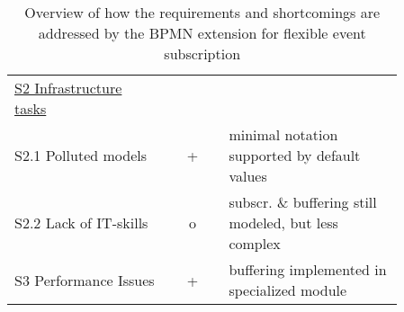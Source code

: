 \begin{table}
\begin{tabularx}{\textwidth}{p{0.4\linewidth} | c | p{0.455\linewidth}}
		\rule{0pt}{4ex}\underline{S2 Infrastructure tasks} & & \\
		S2.1 Polluted models & + & minimal notation supported by default values \\
		S2.2 Lack of IT-skills & o & subscr. \& buffering still modeled, but less complex \\
		
		\rule{0pt}{4ex}S3 Performance Issues & + & buffering implemented in specialized module \\		
		
	\end{tabularx}
	\caption[]{Overview of how the requirements and shortcomings are addressed by the BPMN extension for flexible event subscription}
	\label{tab:concept-vs-requirements}
\end{table}